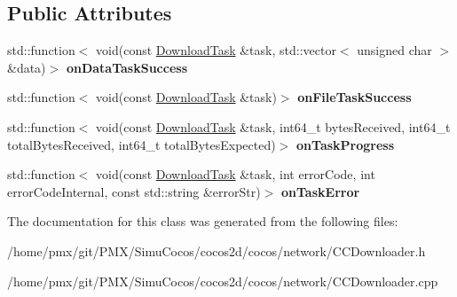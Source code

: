 \subsection*{Public Attributes}
\begin{DoxyCompactItemize}
\item 
\mbox{\label{classcocos2d_1_1network_1_1Downloader_a532db190ecddcc8bd2b09f9961972959}} 
std\+::function$<$ void(const \hyperlink{classcocos2d_1_1network_1_1DownloadTask}{Download\+Task} \&task, std\+::vector$<$ unsigned char $>$ \&data)$>$ {\bfseries on\+Data\+Task\+Success}
\item 
\mbox{\label{classcocos2d_1_1network_1_1Downloader_a577c214a2d43b4fae0185311367c986c}} 
std\+::function$<$ void(const \hyperlink{classcocos2d_1_1network_1_1DownloadTask}{Download\+Task} \&task)$>$ {\bfseries on\+File\+Task\+Success}
\item 
\mbox{\label{classcocos2d_1_1network_1_1Downloader_ab1095736c45d1d04930fe85e9403a73d}} 
std\+::function$<$ void(const \hyperlink{classcocos2d_1_1network_1_1DownloadTask}{Download\+Task} \&task, int64\+\_\+t bytes\+Received, int64\+\_\+t total\+Bytes\+Received, int64\+\_\+t total\+Bytes\+Expected)$>$ {\bfseries on\+Task\+Progress}
\item 
\mbox{\label{classcocos2d_1_1network_1_1Downloader_a132ebcc37f3f54333ab8201a7715d1b1}} 
std\+::function$<$ void(const \hyperlink{classcocos2d_1_1network_1_1DownloadTask}{Download\+Task} \&task, int error\+Code, int error\+Code\+Internal, const std\+::string \&error\+Str)$>$ {\bfseries on\+Task\+Error}
\end{DoxyCompactItemize}


The documentation for this class was generated from the following files\+:\begin{DoxyCompactItemize}
\item 
/home/pmx/git/\+P\+M\+X/\+Simu\+Cocos/cocos2d/cocos/network/C\+C\+Downloader.\+h\item 
/home/pmx/git/\+P\+M\+X/\+Simu\+Cocos/cocos2d/cocos/network/C\+C\+Downloader.\+cpp\end{DoxyCompactItemize}
